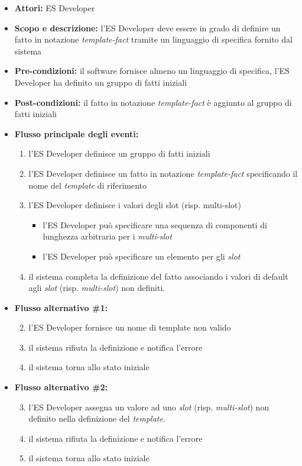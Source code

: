 \begin{itemize}
	\item \textbf{Attori:} ES Developer
	\item \textbf{Scopo e descrizione:}  l'ES Developer deve essere in grado di definire un fatto in notazione \emph{template-fact} tramite un linguaggio di specifica fornito dal sistema
	\item \textbf{Pre-condizioni:} il software fornisce almeno un linguaggio di specifica, l'ES Developer ha definito un gruppo di fatti iniziali
	\item \textbf{Post-condizioni:} il fatto in notazione \emph{template-fact} è aggiunto al gruppo di fatti iniziali
	\item \textbf{Flusso principale degli eventi:}
		\begin{enumerate}
			\item l'ES Developer definisce un gruppo di fatti iniziali
			\item l'ES Developer definisce un fatto in notazione \emph{template-fact} specificando il nome del \emph{template} di riferimento
			\item l'ES Developer definisce i valori degli slot (risp. multi-slot)
				\begin{itemize}
					\item l'ES Developer può specificare una sequenza di componenti di lunghezza arbitraria per i \emph{multi-slot}
					\item l'ES Developer può specificare un elemento per gli \emph{slot}
				\end{itemize}
			\item il sistema completa la definizione del fatto associando i valori di default agli \emph{slot} (risp. \emph{multi-slot}) non definiti.
		\end{enumerate}
	\item \textbf{Flusso alternativo \#1:}
		\begin{enumerate}
			\setcounter{enumi}{1}
			\item l'ES Developer fornisce un nome di template non valido
			\item il sistema rifiuta la definizione e notifica l'errore
			\item il sistema torna allo stato iniziale
		\end{enumerate}
	\item \textbf{Flusso alternativo \#2:}
		\begin{enumerate}
			\setcounter{enumi}{2}
			\item l'ES Developer assegna un valore ad uno \emph{slot} (risp. \emph{multi-slot}) non definito nella definizione del \emph{template}.
			\item il sistema rifiuta la definizione e notifica l'errore
			\item il sistema torna allo stato iniziale
		\end{enumerate}
\end{itemize}


